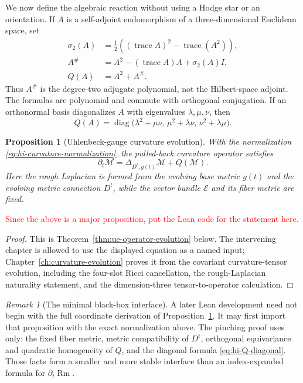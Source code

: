 \documentclass[10pt]{coll-l}
\newcommand{\trace}{\operatorname{trace}}
\newtheorem{proposition}[theorem]{Proposition}
\theoremstyle{definition}
\theoremstyle{remark}
\newtheorem{remark}[theorem]{Remark}
\numberwithin{section}{chapter}
\numberwithin{equation}{chapter}
\newcommand{\Rm}{\operatorname{Rm}}
\begin{document}
We now define the algebraic reaction without using a Hodge star or an
orientation.  If $A$ is a self-adjoint endomorphism of a three-dimensional
Euclidean space, set
\begin{align}
 \sigma_2(A)
   &=\frac12\left((\trace A)^2-\trace(A^2)\right),          \label{eq:hi-sigma-two}\\
 A^\#
   &=A^2-(\trace A)A+\sigma_2(A)I,                         \label{eq:hi-adjugate}\\
 Q(A)&=A^2+A^\#.                                          \label{eq:hi-reaction}
\end{align}
Thus $A^\#$ is the degree-two adjugate polynomial, not the
Hilbert-space adjoint.  The formulas are polynomial and commute with
orthogonal conjugation.  If an orthonormal basis diagonalizes $A$ with
eigenvalues $\lambda,\mu,\nu$, then
\begin{equation}
 Q(A)=\operatorname{diag}
 \bigl(\lambda^2+\mu\nu,\,
       \mu^2+\lambda\nu,\,
       \nu^2+\lambda\mu\bigr).                            \label{eq:hi-Q-diagonal}
\end{equation}

\begin{proposition}[Uhlenbeck-gauge curvature evolution]
\label{prop:hi-uhlenbeck-evolution}
With the normalization \eqref{eq:hi-curvature-normalization}, the
pulled-back curvature operator satisfies
\begin{equation}
 \partial_t\mathcal M
   =\Delta_{D^t,g(t)}\mathcal M+Q(\mathcal M).             \label{eq:hi-fixed-bundle-pde}
\end{equation}
Here the rough Laplacian is formed from the evolving base metric $g(t)$ and
the evolving metric connection $D^t$, while the vector bundle
$\mathcal E$ and its fiber metric are fixed.
\end{proposition}

\textcolor{red}{Since the above is a major proposition, put the Lean code for the statement here.}

\begin{proof}
This is Theorem~\ref{thm:ue-operator-evolution} below.  The intervening
chapter is allowed to use the displayed equation as a named input;
Chapter~\ref{ch:curvature-evolution} proves it from the covariant
curvature-tensor evolution, including the four-slot Ricci cancellation,
the rough-Laplacian naturality statement, and the dimension-three
tensor-to-operator calculation.
\end{proof}

\begin{remark}[The minimal black-box interface]
\label{rem:hi-evolution-blackbox}
A later Lean development need not begin with the full coordinate derivation
of Proposition~\ref{prop:hi-uhlenbeck-evolution}.  It may first import that
proposition with the exact normalization above.  The pinching proof uses
only: the fixed fiber metric, metric compatibility of $D^t$,
orthogonal equivariance and quadratic homogeneity of $Q$, and the diagonal
formula \eqref{eq:hi-Q-diagonal}.  Those facts form a smaller and more stable
interface than an index-expanded formula for $\partial_t\Rm$.
\end{remark}
\end{document}
